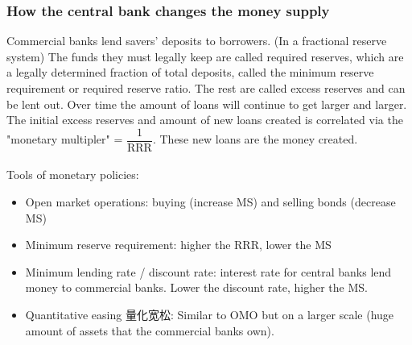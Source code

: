 \subsubsection*{How the central bank changes the money supply}
Commercial banks lend savers' deposits to borrowers. (In a fractional reserve system) The funds they must legally keep are called required reserves, which are a legally determined fraction of total deposits, called the minimum reserve requirement or required reserve ratio. The rest are called excess reserves and can be lent out. Over time the amount of loans will continue to get larger and larger. The initial excess reserves and amount of new loans created is correlated via the "monetary multipler" = $\dfrac{1}{\text{RRR}}$. These new loans are the money created.\\\\
Tools of monetary policies:
\begin{itemize}
  \item Open market operations: buying (increase MS) and selling bonds (decrease MS)
  \item Minimum reserve requirement: higher the RRR, lower the MS
  \item Minimum lending rate / discount rate: interest rate for central banks lend money to commercial banks. Lower the discount rate, higher the MS.
  \item Quantitative easing 量化宽松: Similar to OMO but on a larger scale (huge amount of assets that the commercial banks own). 
\end{itemize}

